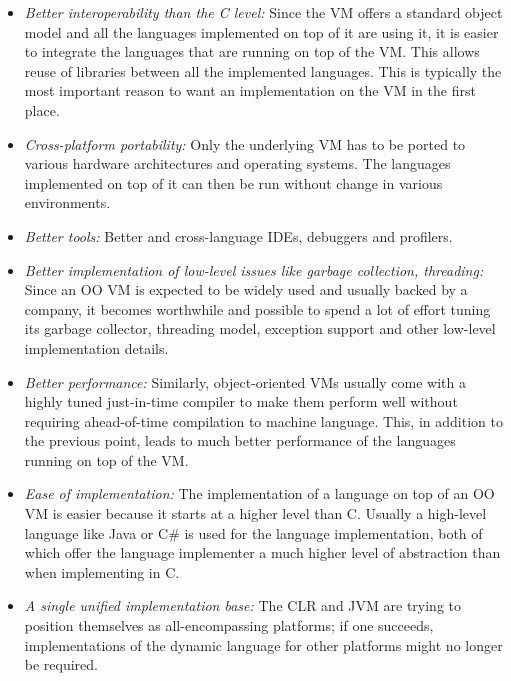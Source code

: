 \documentclass{llncs}
\begin{document}
\begin{itemize}
\item
\emph{Better interoperability than the C level:} Since the VM offers a standard
object model and all the languages implemented on top of it are using it, it is
easier to integrate the languages that are running on top of the VM. This
allows reuse of libraries between all the implemented languages. This is
typically the most important reason to want an implementation on the VM in
the first place.

\item
\emph{Cross-platform portability:} Only the underlying VM has to be ported to
various hardware architectures and operating systems. The languages implemented
on top of it can then be run without change in various environments.

\item
\emph{Better tools:} Better and cross-language IDEs, debuggers and profilers.

\item
\emph{Better implementation of low-level issues like garbage collection,
threading:} Since an OO VM is expected to be widely used and usually backed by
a company, it becomes worthwhile and possible to spend a lot of effort tuning
its garbage collector, threading model, exception support and other low-level
implementation details.

\item
\emph{Better performance:} Similarly, object-oriented VMs usually come with a
highly tuned just-in-time compiler to make them perform well without requiring
ahead-of-time compilation to machine language. This, in addition to the
previous point, leads to much better performance of the languages running on top
of the VM.

\item
\emph{Ease of implementation:} The implementation of a language on top of an OO
VM is easier because it starts at a higher level than C. Usually a
high-level language like Java or C\# is used for the language implementation,
both of which offer the language implementer a much higher level of abstraction
than when implementing in C. 

\item
\emph{A single unified implementation base:} The CLR and JVM are trying
to position themselves as all-encompassing platforms; if one succeeds,
implementations of the dynamic language for other platforms might no longer
be required.
\end{itemize}
\end{document}
